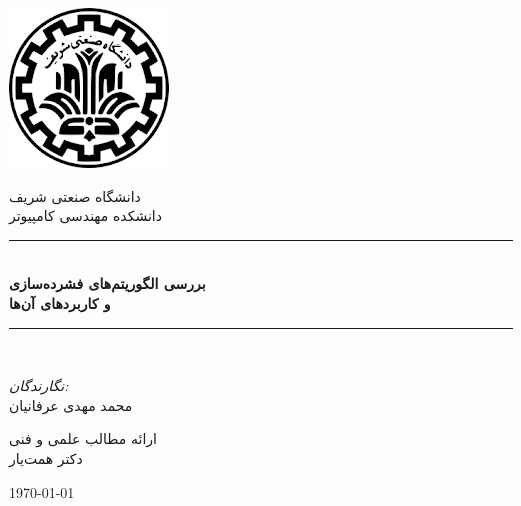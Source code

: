 \newcommand{\HRule}{\rule{\linewidth}{0.1mm}} 
\center %

    \includegraphics[scale=0.5]{figs/sharif.png}%

    \vspace{0.2cm}
    \textsc{ دانشگاه صنعتی شریف}\\[0.2cm] %
    \textsc{ دانشکده مهندسی کامپیوتر}\\[0.2cm]%


\HRule \\[0.4cm]
    { \huge \bfseries بررسی الگوریتم‌های فشرده‌سازی \\و کاربردهای آن‌ها}\\[0.1cm] %
\HRule \\[1.5cm]
 
\begin{minipage}{0.4\textwidth}
\begin{center}

 \large
    
    \emph{نگارندگان:}\\
    محمد مهدی عرفانیان\\
    \vspace{1cm}
    
    \Large{ارائه مطالب علمی و فنی}\\[1cm]
    {دکتر همت‌یار}
    \end{center}
\end{minipage}
\vspace{30mm}

{\large \today}\\[1cm] %
\vfill %